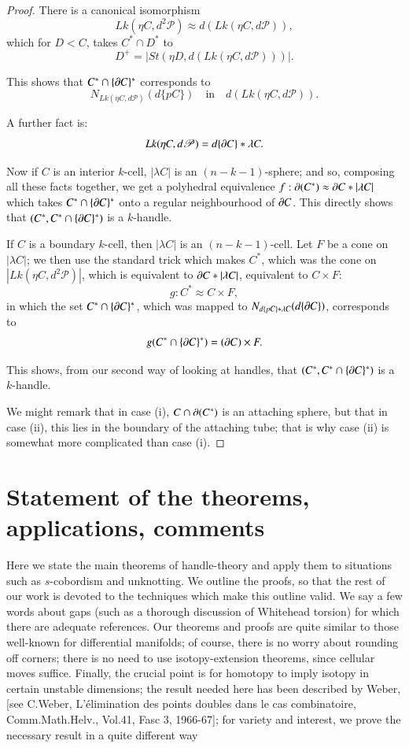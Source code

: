 \begin{proof}
There is a canonical isomorphism
$$
Lk(\eta C, d^{2}\mathscr{P})\approx d(Lk(\eta C,d\mathscr{P})),
$$
which for $D<C$, takes $C^{*}\cap D^{*}$ to 
$$
D^{+}=|St(\eta D, d(Lk(\eta C,d\mathscr{P})))|.
$$

This shows that $C^{*}\cap \{\partial C\}^{*}$ corresponds to
$$
N_{Lk(\eta C, d\mathscr{P})}(d\{p C\})\quad\text{in}\quad d(Lk(\eta C,d\mathscr{P})).
$$

A further fact is:
$$
Lk(\eta C, d\mathscr{P})=d\{\partial C\}\ast \lambda C.
$$

Now if $C$ is an interior $k$-cell, $|\lambda C|$ is an $(n-k-1)$-sphere; and so, composing all these facts together, we get a polyhedral equivalence $f:\partial (C^{*})\approx \partial C\ast |\lambda C|$ which takes $C^{*}\cap \{\partial C\}^{*}$ onto a regular neighbourhood of $\partial C$. This directly shows that $(C^{*},C^{*}\cap \{\partial C\}^{*})$ is a $k$-handle.

If $C$ is a boundary $k$-cell, then $|\lambda C|$ is an $(n-k-1)$-cell. Let $F$ be a cone on $|\lambda C|$; we then use the standard trick which makes $C^{*}$, which was the cone on $|Lk(\eta C, d^{2}\mathscr{P})|$, which is equivalent to $\partial C\ast |\lambda C|$, equivalent to $C\times F$:
$$
g:C^{*}\approx C\times F,
$$\pageoriginale
in which the set $C^{*}\cap \{\partial C\}^{*}$, which was mapped to $N_{d\{p C\}\ast \lambda C}(d\{\partial C\})$, corresponds to
$$
g(C^{*}\cap \{\partial C\}^{*})=(\partial C)\times F.
$$

This shows, from our second way of looking at handles, that
$(C^{*},\break C^{*}\cap \{\p C\}^{*})$ is a $k$-handle. 

We might remark that in case (i), $C\cap \partial (C^{*})$ is an attaching sphere, but that in case (ii), this lies in the boundary of the attaching tube; that is why case (ii) is somewhat more complicated than case (i).
\end{proof}

\section{Statement of the theorems, applications, comments}\label{chap8-sec8.3}

Here we state the main theorems of handle-theory and apply them to situations such as $s$-cobordism and unknotting. We outline the proofs, so that the rest of our work is devoted to the techniques which make this outline valid. We say a few words about gaps (such as a thorough discussion of Whitehead torsion)  for which there are adequate references. Our theorems and proofs are quite similar to those well-known for differential manifolds; of course, there is no worry about rounding off corners; there is no need to use isotopy-extension theorems, since cellular moves suffice. Finally, the crucial point is for homotopy to imply isotopy in certain unstable dimensions; the result needed here has been described by Weber, [see C.\@ Weber, L'\'elimination des points doubles dans le cas combinatoire, Comm.\@ Math.\@ Helv., Vol.41, Fasc 3, 1966-67]; for variety and interest, we prove the necessary result in a quite different way 


